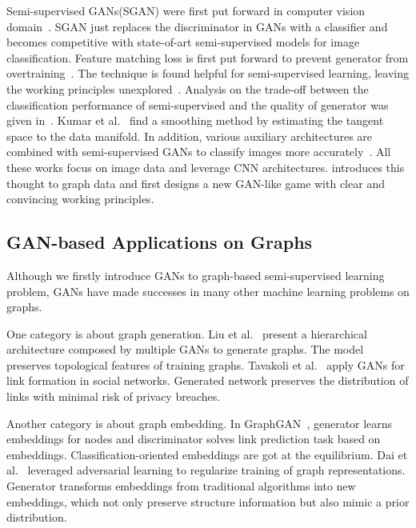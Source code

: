 Semi-supervised GANs(SGAN) were first put forward in computer vision domain~\cite{odena2016semi}. SGAN just replaces the discriminator in GANs with a classifier and becomes competitive with state-of-art semi-supervised models for image classification. Feature matching loss is first put forward to prevent generator from overtraining~\cite{salimans2016improved}. The technique is found helpful for semi-supervised learning, leaving the working principles unexplored~\cite{salimans2016improved}. Analysis on the trade-off between the classification performance of semi-supervised and the quality of generator was given in~\cite{dai2017good}. Kumar et al.~ find a smoothing method by estimating the tangent space to the data manifold. In addition, various auxiliary architectures are combined with semi-supervised GANs to classify images more accurately~\cite{maaloe2016auxiliary,dumoulin2016adversarially,chongxuan2017triple}. All these works focus on image data and leverage CNN architectures. \smodel introduces this thought to graph data and first designs a new GAN-like game with clear and convincing working principles. 

\subsection{GAN-based Applications on Graphs}
Although we firstly introduce GANs to graph-based semi-supervised learning problem, GANs have made successes in many other machine learning problems on graphs.

One category is about graph generation. Liu et al.~ present a hierarchical architecture composed by multiple GANs to generate graphs. The model preserves topological features of training graphs. Tavakoli et al.~ apply GANs for link formation in social networks. Generated network preserves the distribution of links with minimal risk of privacy breaches. 

Another category is about graph embedding. 
In GraphGAN~\cite{wang2017graphgan}, generator learns embeddings for nodes and discriminator solves link prediction task based on embeddings. Classification-oriented embeddings are got at the equilibrium. Dai et al.~ leveraged adversarial learning to regularize training of graph representations. Generator transforms embeddings from traditional algorithms into new embeddings, which not only preserve structure information but also mimic a prior distribution. 


